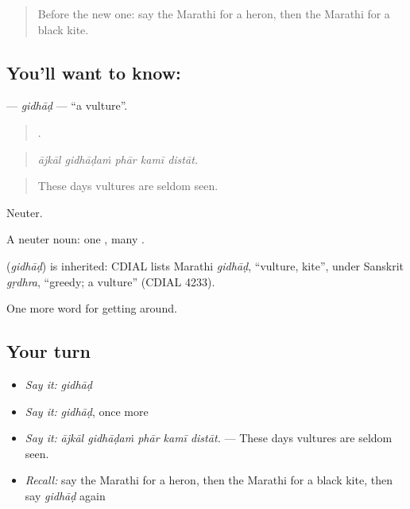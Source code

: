 \begin{quote}
Before the new one: say the Marathi for a heron, then the Marathi for a black kite.
\end{quote}

\subsection*{You'll want to know: }
\textbf{} — \emph{gidhāḍ} — \textquotedblleft{}a vulture\textquotedblright{}.

\begin{quote}
    .
\end{quote}

\begin{quote}
\emph{ājkāl gidhāḍaṁ phār kamī distāt.}
\end{quote}

\begin{quote}
These days vultures are seldom seen.
\end{quote}

Neuter.

A neuter noun: one , many .

\begin{cousinweb}
\textbf{} (\emph{gidhāḍ}) is inherited: CDIAL lists Marathi \emph{gidhāḍ}, \textquotedblleft{}vulture, kite\textquotedblright{}, under Sanskrit \emph{gṛdhra}, \textquotedblleft{}greedy; a vulture\textquotedblright{} (CDIAL 4233).
\end{cousinweb}

\begin{grammarlens}[title={What you've built}]
One more word for getting around.
\end{grammarlens}

\subsection*{Your turn}
\begin{itemize}
\raggedright
  \item \emph{Say it:} \emph{gidhāḍ}
  \item \emph{Say it:} \emph{gidhāḍ}, once more
  \item \emph{Say it:} \emph{ājkāl gidhāḍaṁ phār kamī distāt.} — These days vultures are seldom seen.
  \item \emph{Recall:} say the Marathi for a heron, then the Marathi for a black kite, then say \emph{gidhāḍ} again
\end{itemize}

